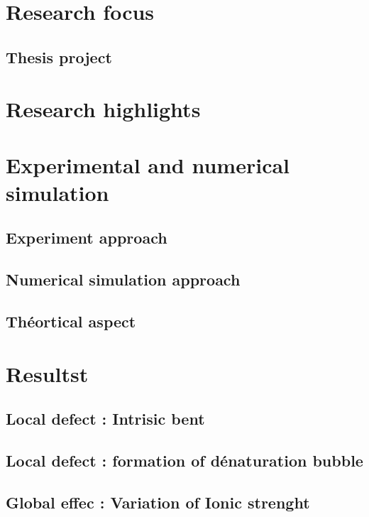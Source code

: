 \section{Research focus}
\subsection{Thesis project}


\section{Research highlights}
\section{Experimental and numerical simulation}
\subsection{Experiment approach}
\subsection{Numerical simulation approach}
\subsection{Théortical aspect}
\section{Resultst}
\subsection{Local defect : Intrisic bent}
\subsection{Local defect : formation of dénaturation bubble}
\subsection{Global effec : Variation of Ionic strenght}


